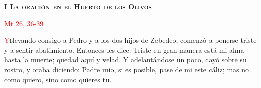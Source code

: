 \begin{center}
    \textbf{\textsc{I La oración en el Huerto de los Olivos}}

    \textcolor{red}{Mt 26, 36-39}
\end{center}

\lettrine[lines=2]{\textcolor{red}{Y}} llevando consigo a Pedro y a los dos hijos de Zebedeo, comenzó a ponerse triste y a sentir abatimiento.
Entonces les dice: Triste en gran manera está mi alma hasta la muerte; quedad aquí y velad. Y adelantándose un poco, cayó sobre su rostro, y oraba
diciendo: Padre mío, si es posible, pase de mi este cáliz; mas no como quiero, sino como quieres tu.